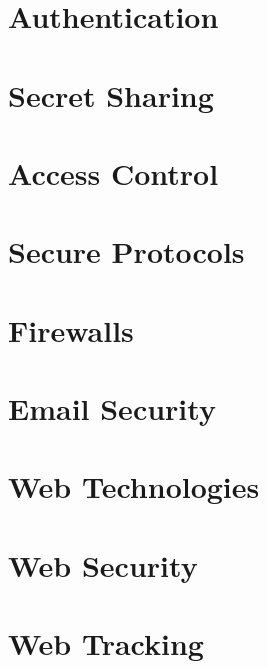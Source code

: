 	\newpage
	\section{Authentication}

	\newpage
	\section{Secret Sharing}

	\newpage
	\section{Access Control}

	\newpage
	\section{Secure Protocols}
	
	\newpage
	\section{Firewalls}

	\newpage
	\section{Email Security}

	\newpage
	\section{Web Technologies}	
	
	\newpage
	\section{Web Security}	
	
	\newpage
	\section{Web Tracking}	
		
